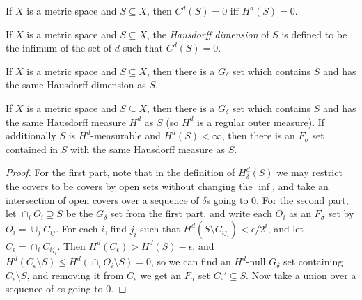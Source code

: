 \documentclass[letterpaper,11pt]{report}
\begin{document}
\begin{prop} If $X$ is a metric space and $S \subseteq X$, then $C^d(S) = 0$ iff $H^d(S) = 0$.
\end{prop}

\begin{defn} If $X$ is a metric space and $S \subseteq X$, the \emph{Hausdorff dimension} of $S$ is defined to be the infimum of the set of $d$ such that $C^d(S) = 0$.
\end{defn}

\begin{prop} If $X$ is a metric space and $S \subseteq X$, then there is a $G_\delta$ set which contains $S$ and has the same Hausdorff dimension as $S$.
\end{prop}

\begin{prop} If $X$ is a metric space and $S \subseteq X$, then there is a $G_\delta$ set which contains $S$ and has the same Hausdorff measure $H^d$ as $S$ (so $H^d$ is a regular outer measure). If additionally $S$ is $H^d$-measurable and $H^d(S) < \infty$, then there is an $F_\sigma$ set contained in $S$ with the same Hausdorff measure as $S$.
\end{prop}
\begin{proof} For the first part, note that in the definition of $H^d_\delta(S)$ we may restrict the covers to be covers by open sets without changing the $\inf$, and take an intersection of open covers over a sequence of $\delta$s going to $0$. For the second part, let $\cap_i O_i \supseteq S$ be the $G_\delta$ set from the first part, and write each $O_i$ as an $F_\sigma$ set by $O_i = \cup_j C_{ij}$. For each $i$, find $j_i$ such that $H^d(S\setminus C_{ij_i}) < \epsilon/2^i$, and let $C_\epsilon = \cap_i C_{ij_i}$. Then $H^d(C_\epsilon) > H^d(S) - \epsilon$, and $H^d(C_\epsilon\setminus S) \le H^d(\cap_i O_i \setminus S) = 0$, so we can find an $H^d$-null $G_\delta$ set containing $C_\epsilon\setminus S$, and removing it from $C_\epsilon$ we get an $F_\sigma$ set $C_\epsilon' \subseteq S$. Now take a union over a sequence of $\epsilon$s going to $0$.
\end{proof}
\end{document}
